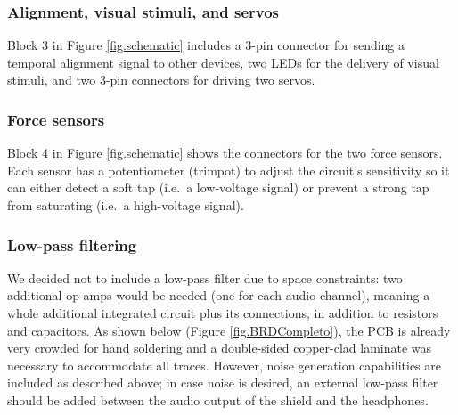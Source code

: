 \documentclass[twocolumn]{article}
\begin{document}
\subsubsection{Alignment, visual stimuli, and servos}

Block 3 in Figure \ref{fig.schematic} includes a 3-pin connector for sending a temporal alignment signal to other devices, two LEDs for the delivery of visual stimuli, and two 3-pin connectors for driving two servos.


\subsubsection{Force sensors}

Block 4 in Figure \ref{fig.schematic} shows the connectors for the two force sensors. Each sensor has a potentiometer (trimpot) to adjust the circuit's sensitivity so it can either detect a soft tap (i.e.\ a low-voltage signal) or prevent a strong tap from saturating (i.e.\ a high-voltage signal).


\subsubsection{Low-pass filtering}

We decided not to include a low-pass filter due to space constraints: two additional op amps would be needed (one for each audio channel), meaning a whole additional integrated circuit plus its connections, in addition to resistors and capacitors. As shown below (Figure \ref{fig.BRDCompleto}), the PCB is already very crowded for hand soldering and a double-sided copper-clad laminate was necessary to accommodate all traces. However, noise generation capabilities are included as described above; in case noise is desired, an external low-pass filter should be added between the audio output of the shield and the headphones.
\end{document}
